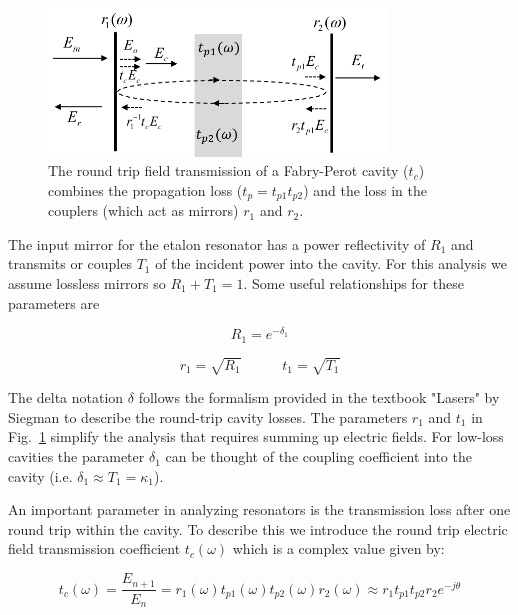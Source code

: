 \documentclass[10pt]{article}
\begin{document}
\begin{figure}[htbp]
\centering\includegraphics[width=0.8\textwidth]{figures/fp_v6}
\caption{The round trip field transmission of a Fabry-Perot cavity ($t_c$) combines the propagation loss ($t_p =  t_{p1}t_{p2}$) and the loss in the couplers (which act as mirrors) $r_1$ and $r_2$.}
\label{fig:fp}
\end{figure}


The input mirror for the etalon resonator has a power reflectivity of $R_1$ and  transmits or couples $T_1$   of the incident power into the cavity.  For this analysis we assume lossless mirrors so $R_1 + T_1 = 1$.  Some useful relationships for these parameters are

\begin{equation}
R_1 = e^{-\delta_1}
\end{equation}

\begin{equation}
    r_1 = \sqrt{R_1} \hspace{35pt} t_1 = \sqrt{T_1}  
\end{equation}
 
The delta notation $\delta$ follows the formalism provided in the textbook "Lasers" by Siegman \cite{Siegman1986} to describe the round-trip cavity losses. 
The parameters $r_1$ and $t_1$ in Fig.~\ref{fig:fp} simplify the analysis that requires summing up electric fields.
For low-loss cavities the parameter $\delta_1$ can be thought of the coupling coefficient into the cavity (i.e. $   \delta_1 \approx T_1 = \kappa_1$).    


An important parameter in analyzing resonators is the transmission loss after one round trip within the cavity.   To describe this we introduce the round trip electric field transmission coefficient $t_c (\omega)$  which is a complex value given by:

\begin{equation}
  t_c (\omega) = \frac{E_{n+1}}{E_n}  = r_1(\omega) t_{p1}(\omega) t_{p2}(\omega)r_2(\omega) \approx r_1 t_{p1} t_{p2} r_2 e^{-j\theta}
\label{equ:tc}
\end{equation}
\end{document}
